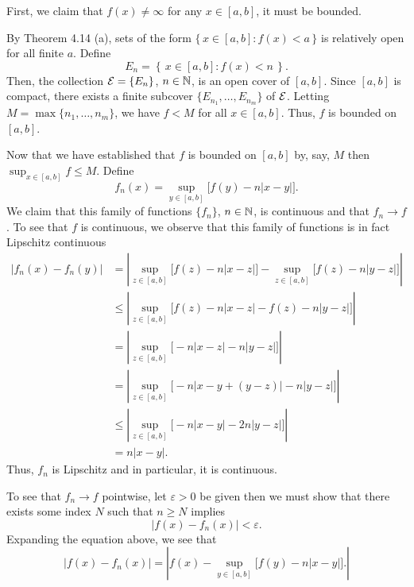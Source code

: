 \begin{solution}
  First, we claim that $f(x)\neq\infty$ for any $x\in[a,b]$, it must be
  bounded.
  \begin{subproof}
    By Theorem 4.14 (a), sets of the form $\{\,x\in[a,b]:f(x)<a\,\}$ is
    relatively open for all finite $a$. Define
    \[
      E_n=\left\{\,x\in [a,b]:f(x)<n\,\right\}.
    \]
    Then, the collection $\mathcal{E}=\{E_n\}$, $n\in\mathbb{N}$, is an open cover of
    $[a,b]$. Since $[a,b]$ is compact, there exists a finite subcover
    $\{E_{n_1},\ldots,E_{n_m}\}$ of $\mathcal{E}$. Letting
    $M=\max\{n_1,\ldots,n_m\}$, we have $f<M$ for all $x\in[a,b]$. Thus,
    $f$ is bounded on $[a,b]$.
  \end{subproof}\noindent
  Now that we have established that $f$ is bounded on $[a,b]$ by, say, $M$
  then $\sup_{x\in[a,b]} f\leq M$. Define
  \[
    f_n(x)=\sup_{y\in[a,b]}\bigl[f(y)-n|x-y|\bigr].
  \]
  We claim that this family of functions $\{f_n\}$, $n\in\mathbb{N}$, is
  continuous and that $f_n\to f$. To see that $f$ is continuous, we observe
  that this family of functions is in fact Lipschitz continuous
  \begin{align*}
    |f_n(x)-f_n(y)|
    &=\left|\sup_{z\in[a,b]}\bigl[ f(z)-n|x-z|
      \bigr]-\sup_{z\in[a,b]}\bigl[ f(z)-n|y-z| \bigr]\right|\\
    &\leq\left|\sup_{z\in[a,b]}\bigl[ f(z)-n|x-z|-f(z)-n|y-z| \bigr]\right|\\
    &=\left|\sup_{z\in[a,b]}\bigl[-n|x-z|-n|y-z|\bigr]\right|\\
    &=\left|\sup_{z\in[a,b]}\bigl[-n|x-y+(y-z)|-n|y-z|\bigr]\right|\\
    &\leq\left|\sup_{z\in[a,b]}\bigl[-n|x-y|-2n|y-z|\bigr]\right|\\
    &=n|x-y|.
  \end{align*}
  Thus, $f_n$ is Lipschitz and in particular, it is continuous.

  To see that $f_n\to f$ pointwise, let $\varepsilon>0$ be given then we
  must show that there exists some index $N$ such that $n\geq N$ implies
  \[
    |f(x)-f_n(x)|<\varepsilon.
  \]
  Expanding the equation above, we see that
  \[
    |f(x)-f_n(x)|=
    \left|
      f(x)-\sup_{y\in[a,b]}\bigl[f(y)-n|x-y|\bigr].
    \right|
  \]
\end{solution}

